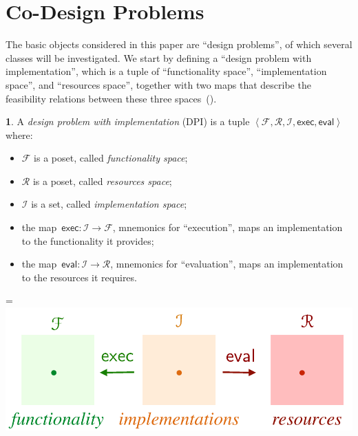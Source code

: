 \documentclass[twocolumn,english]{IEEEtran}
\theoremstyle{definition}
\newtheorem{defn}{\protect\definitionname}
\theoremstyle{plain}
\theoremstyle{definition}
\theoremstyle{remark}
\theoremstyle{definition}
\theoremstyle{plain}
\theoremstyle{plain}
\newcommand{\aword}[1]{\mathsf{#1}}
\newcommand{\vmath}[1]{\aword{#1}}
\newcommand{\funsp}{\mathscr{F}}
\newcommand{\impsp}{\mathscr{I}}
\newcommand{\exc}{\vmath{exec}}
\newcommand{\eval}{\vmath{eval}}
\newcommand{\ressp}{\mathscr{R}}
\newcommand{\colR}{\color[rgb]{0.555789,0.000000,0.000000}}
\newcommand{\colF}{\color[rgb]{0.094869,0.500000,0.000000}}
\newcommand{\colI}{\color[RGB]{214,120,5}}
\newcommand{\R}[1]{{\colR #1}}
\newcommand{\F}[1]{{\colF #1}}
\newcommand{\I}[1]{{\colI #1}}
\newcommand*{\vcenteredhbox}[1]{\begingroup
\setbox0=\hbox{#1}\parbox{\wd0}{\box0}\endgroup}
\newcommand{\captionsideleft}[2]{
    \medskip
    \begin{minipage}{1.8cm}{
        \hfill
        \protect\captionof{figure}{#1}}\end{minipage}
    \begin{minipage}{6.6cm}
    
    \vcenteredhbox{{#2}}
    \hfill
    \end{minipage}
    \medskip
}
\providecommand{\definitionname}{Definition}
\begin{document}
\section{Co-Design Problems\label{sec:Design-Problems}}

The basic objects considered in this paper are ``design problems'',
of which several classes will be investigated. We start by defining
a ``design problem with implementation'', which is a tuple of ``\F{functionality}
space'', ``\I{implementation} space'', and ``\R{resources}
space'', together with two maps that describe the feasibility relations
between these three spaces~().
\begin{defn}
\label{def:design_problem}A \emph{design problem with implementation}
(DPI) is a tuple $\left\langle \funsp,\ressp,\impsp,\exc,\eval\right\rangle $
where:

\begin{itemize}
\item $\funsp$ is a poset, called \emph{\F{functionality} space};
\item $\ressp$ is a poset, called \emph{\R{resources} space};
\item $\impsp$ is a set, called \emph{\I{implementation} space};
\item the map~$\exc\colon\impsp\rightarrow\funsp$, mnemonics for ``execution'',
maps an implementation to the functionality it provides;
\item the map~$\eval\colon\impsp\rightarrow\ressp$, mnemonics for ``evaluation'',
maps an implementation to the resources it requires.
\end{itemize}
\captionsideleft{\label{fig:setup}}{\includegraphics[scale=0.33]{gmcdp_setup}}
\end{defn}
\end{document}
